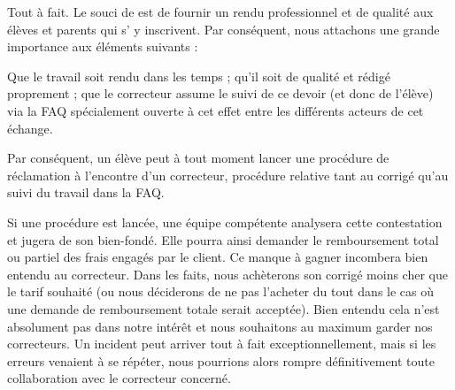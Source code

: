 ﻿Tout à fait. Le souci de \eDevoir est de fournir un rendu professionnel et de qualité aux élèves et parents qui s' y inscrivent. Par conséquent, nous attachons une grande importance aux éléments suivants :
\begin{itemize}
	\li Que le travail soit rendu dans les temps ;
	\li qu'il soit de qualité et rédigé proprement ;
	\li que le correcteur assume le suivi de ce devoir (et donc de l'élève) via la FAQ spécialement ouverte à cet effet entre les différents acteurs de cet échange.
\end{itemize}

Par conséquent, un élève peut à tout moment lancer une procédure de réclamation à l'encontre d'un correcteur, procédure relative tant au corrigé qu'au suivi du travail dans la FAQ.

Si une procédure est lancée, une équipe compétente analysera cette contestation et jugera de son bien-fondé. Elle pourra ainsi demander le remboursement total ou partiel des frais engagés par le client. Ce manque à gagner incombera bien entendu au correcteur. Dans les faits, nous achèterons son corrigé moins cher que le tarif souhaité (ou nous déciderons de ne pas l'acheter du tout dans le cas où une demande de remboursement totale serait acceptée). Bien entendu cela n'est absolument pas dans notre intérêt et nous souhaitons au maximum garder nos correcteurs. Un incident peut arriver tout à fait exceptionnellement, mais si les erreurs venaient à se répéter, nous pourrions alors rompre définitivement toute collaboration avec le correcteur concerné.